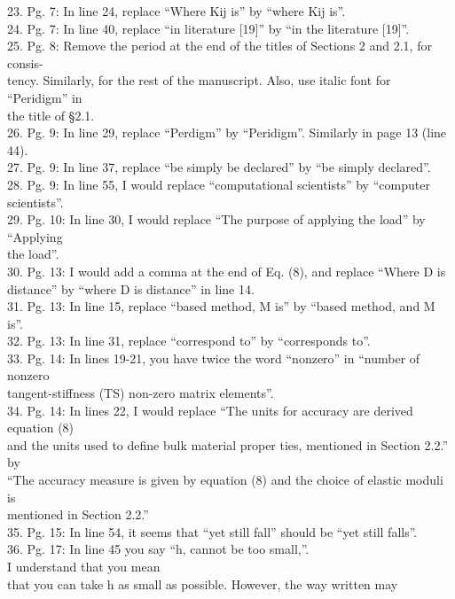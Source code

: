23. Pg. 7: In line 24, replace ``Where Kij is'' by ``where Kij is''.
\\24. Pg. 7: In line 40, replace ``in literature {[}19{]}'' by ``in the
literature {[}19{]}''. \\25. Pg. 8: Remove the period at the end of the
titles of Sections 2 and 2.1, for consis- \\tency. Similarly, for the
rest of the manuscript. Also, use italic font for ``Peridigm'' in \\the
title of §2.1. \\26. Pg. 9: In line 29, replace ``Perdigm'' by
``Peridigm''. Similarly in page 13 (line 44). \\27. Pg. 9: In line 37,
replace ``be simply be declared'' by ``be simply declared''. \\28. Pg.
9: In line 55, I would replace ``computational scientists'' by
``computer scientists''. \\29. Pg. 10: In line 30, I would replace ``The
purpose of applying the load'' by ``Applying \\the load''. \\30. Pg. 13:
I would add a comma at the end of Eq. (8), and replace ``Where D is
\\distance'' by ``where D is distance'' in line 14. \\31. Pg. 13: In
line 15, replace ``based method, M is'' by ``based method, and M is''.
\\32. Pg. 13: In line 31, replace ``correspond to'' by ``corresponds
to''. \\33. Pg. 14: In lines 19-21, you have twice the word ``nonzero''
in ``number of nonzero \\tangent-stiffness (TS) non-zero matrix
elements''. \\34. Pg. 14: In lines 22, I would replace ``The units for
accuracy are derived equation (8) \\and the units used to deﬁne bulk
material proper ties, mentioned in Section 2.2.'' by \\``The accuracy
measure is given by equation (8) and the choice of elastic moduli is
\\mentioned in Section 2.2.'' \\35. Pg. 15: In line 54, it seems that
``yet still fall'' should be ``yet still falls''. \\36. Pg. 17: In line
45 you say ``h, cannot be too small,''. \\I understand that you mean
\\that you can take h as small as possible. However, the way written may
